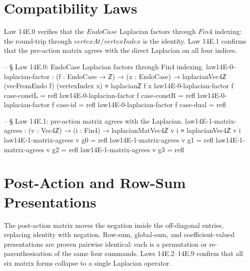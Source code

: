 \documentclass[11pt,a4paper]{book}
\def\mathrm#1{#1}%
\begin{document}
\section{Compatibility Laws}

Law 14E.0 verifies that the $\mathrm{EndoCase}$ Laplacian factors through $\mathrm{Fin4}$ indexing: the round-trip through $\mathrm{vertexAt}/\mathrm{vertexIndex}$ is the identity.
Law 14E.1 confirms that the pre-action matrix agrees with the direct Laplacian on all four indices.

\begin{code}
-- § Law 14E.0: EndoCase Laplacian factors through Fin4 indexing.
law14E-0-laplacian-factor : (f : EndoCase → ℤ) → (x : EndoCase) →
  laplacianVec4ℤ (vecFromEndo f) (vertexIndex x) ≡ laplacianℤ f x
law14E-0-laplacian-factor f case-constL = refl
law14E-0-laplacian-factor f case-constR = refl
law14E-0-laplacian-factor f case-id = refl
law14E-0-laplacian-factor f case-dual = refl

-- § Law 14E.1: pre-action matrix agrees with the Laplacian.
law14E-1-matrix-agrees : (v : Vec4ℤ) → (i : Fin4) →
  laplacianMatVec4ℤ v i ≡ laplacianVec4ℤ v i
law14E-1-matrix-agrees v g0 = refl
law14E-1-matrix-agrees v g1 = refl
law14E-1-matrix-agrees v g2 = refl
law14E-1-matrix-agrees v g3 = refl
\end{code}

\section{Post-Action and Row-Sum Presentations}

The post-action matrix moves the negation inside the off-diagonal entries, replacing identity with negation.
Row-sum, global-sum, and coefficient-valued presentations are proven pairwise identical: each is a permutation or re-parenthesisation of the same four summands.
Laws 14E.2--14E.9 confirm that all six matrix forms collapse to a single Laplacian operator.
\end{document}
